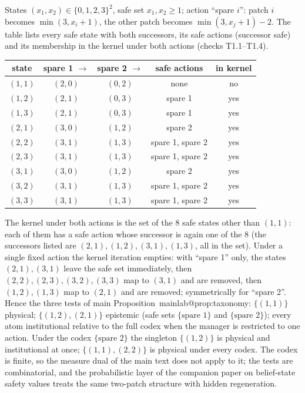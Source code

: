 \documentclass[11pt,a4paper]{article}
\makeatletter
\theoremstyle{plain}
\theoremstyle{definition}
\theoremstyle{remark}
\newcommand{\mref}[1]{\csname mainlab@#1\endcsname}
\makeatother
\begin{document}
States $(x_1,x_2)\in\{0,1,2,3\}^2$, safe set $x_1,x_2\ge1$; action ``spare $i$'': patch $i$ becomes $\min(3,x_i+1)$, the other patch becomes $\min(3,x_j+1)-2$. The table lists every safe state with both successors, its safe actions (successor safe) and its membership in the kernel under both actions (checks T1.1--T1.4).
\begin{center}\small
\begin{tabular}{ccccc}
\toprule
state & spare 1 $\to$ & spare 2 $\to$ & safe actions & in kernel\\
\midrule
$(1,1)$ & $(2,0)$ & $(0,2)$ & none & no\\
$(1,2)$ & $(2,1)$ & $(0,3)$ & spare 1 & yes\\
$(1,3)$ & $(2,1)$ & $(0,3)$ & spare 1 & yes\\
$(2,1)$ & $(3,0)$ & $(1,2)$ & spare 2 & yes\\
$(2,2)$ & $(3,1)$ & $(1,3)$ & spare 1, spare 2 & yes\\
$(2,3)$ & $(3,1)$ & $(1,3)$ & spare 1, spare 2 & yes\\
$(3,1)$ & $(3,0)$ & $(1,2)$ & spare 2 & yes\\
$(3,2)$ & $(3,1)$ & $(1,3)$ & spare 1, spare 2 & yes\\
$(3,3)$ & $(3,1)$ & $(1,3)$ & spare 1, spare 2 & yes\\
\bottomrule
\end{tabular}
\end{center}
The kernel under both actions is the set of the $8$ safe states other than $(1,1)$: each of them has a safe action whose successor is again one of the $8$ (the successors listed are $(2,1),(1,2),(3,1),(1,3)$, all in the set). Under a single fixed action the kernel iteration empties: with ``spare 1'' only, the states $(2,1),(3,1)$ leave the safe set immediately, then $(2,2),(2,3),(3,2),(3,3)$ map to $(3,1)$ and are removed, then $(1,2),(1,3)$ map to $(2,1)$ and are removed; symmetrically for ``spare 2''. Hence the three tests of main Proposition~\mref{prop:taxonomy}: $\{(1,1)\}$ physical; $\{(1,2),(2,1)\}$ epistemic (safe sets $\{\text{spare }1\}$ and $\{\text{spare }2\}$); every atom institutional relative to the full codex when the manager is restricted to one action. Under the codex $\{\text{spare }2\}$ the singleton $\{(1,2)\}$ is physical and institutional at once; $\{(1,1),(2,2)\}$ is physical under every codex. The codex is finite, so the measure dual of the main text does not apply to it; the tests are combinatorial, and the probabilistic layer of the companion paper on belief-state safety values treats the same two-patch structure with hidden regeneration.
\end{document}
